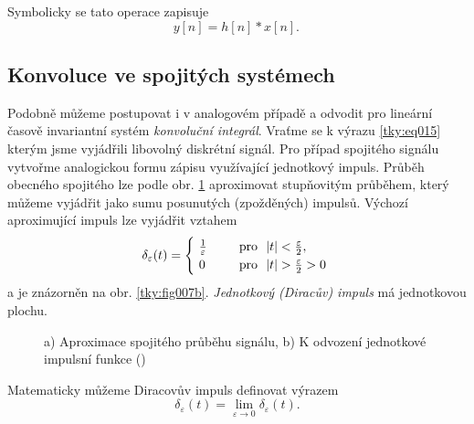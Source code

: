       Symbolicky se tato operace zapisuje 
      \begin{equation}\label{tky:eq026}
        \boxed{y[n] = h[n]*x[n]. \,}
      \end{equation}
      

    \subsection{Konvoluce ve spojitých systémech}\label{tky:IchIIsecIssecIII}
      Podobně můžeme postupovat i v analogovém případě a odvodit pro lineární časově invariantní
      systém \emph{konvoluční integrál}. Vraťme se k výrazu \ref{tky:eq015} kterým jsme vyjádřili
      libovolný diskrétní signál. Pro případ spojitého signálu vytvořme analogickou formu zápisu
      využívající jednotkový impuls. Průběh obecného spojitého lze podle obr. \ref{tky:fig007}
      aproximovat stupňovitým průběhem, který můžeme vyjádřit jako sumu posunutých (zpožděných)
      impulsů. Výchozí aproximující impuls lze vyjádřit vztahem
      \begin{equation}\label{tky:eq027}
          \delta_\varepsilon(t)  =
            \begin{cases}
               \frac{1}{\varepsilon} & \text{pro } \abs{t} < \frac{\varepsilon}{2},      \\
               0                  & \text{pro } \abs{t} > \frac{\varepsilon}{2} > 0
            \end{cases}
      \end{equation}
      a je znázorněn na obr. \ref{tky:fig007b}. \emph{Jednotkový (Diracův) impuls} 
      má jednotkovou plochu.
      \begin{figure}[ht!]
        \centering
        \caption{a) Aproximace spojitého průběhu signálu, b) K odvození jednotkové impulsní funkce 
        (\cite[s.~7]{Bicak2007})}
        \label{tky:fig007}
      \end{figure}
      Matematicky můžeme Diracovův impuls definovat výrazem
      \begin{equation}\label{tky:eq028}
        \delta_\varepsilon(t) = \lim_{\varepsilon\rightarrow0} \delta_\varepsilon(t).
      \end{equation}

